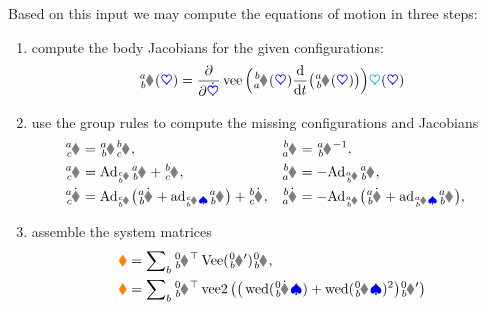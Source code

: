 Based on this input we may compute the equations of motion in three steps:
\begin{enumerate}
\item compute the body Jacobians for the given configurations:
\begin{align}\label{eq:RBSAlogJacobian}
 \bodyJac{\BidxI}{\BidxII}(\sysCoord) = \pdiff{\sysCoordd} \veeOp\Big( \bodyHomoCoord{\BidxII}{\BidxI}(\sysCoord) \diff{t} \big(\bodyHomoCoord{\BidxI}{\BidxII}(\sysCoord) \big) \Big) \kinMat(\sysCoord)
\end{align}
\item use the group rules to compute the missing configurations and Jacobians
\begin{subequations}
\begin{align}
 \bodyHomoCoord{\BidxI}{\BidxIII} &= \bodyHomoCoord{\BidxI}{\BidxII} \bodyHomoCoord{\BidxII}{\BidxIII},&
 \bodyHomoCoord{\BidxII}{\BidxI} &= \bodyHomoCoord{\BidxI}{\BidxII}^{-1},&
\\
 \bodyJac{\BidxI}{\BidxIII} &= \Ad{\bodyHomoCoord{\BidxIII}{\BidxII}} \bodyJac{\BidxI}{\BidxII} + \bodyJac{\BidxII}{\BidxIII},&
 \bodyJac{\BidxII}{\BidxI} &= -\Ad{\bodyHomoCoord{\BidxI}{\BidxII}} \bodyJac{\BidxI}{\BidxII},&
\\
 \bodyJacd{\BidxI}{\BidxIII} &= \Ad{\bodyHomoCoord{\BidxIII}{\BidxII}} \big(\bodyJacd{\BidxI}{\BidxII} + \ad{\bodyJac{\BidxIII}{\BidxII}\sysVel} \bodyJac{\BidxI}{\BidxII} \big) + \bodyJacd{\BidxII}{\BidxIII},&
 \bodyJacd{\BidxII}{\BidxI} &= -\Ad{\bodyHomoCoord{\BidxI}{\BidxII}} \big(\bodyJacd{\BidxI}{\BidxII} + \ad{\bodyJac{\BidxI}{\BidxII}\sysVel} \bodyJac{\BidxI}{\BidxII} \big),&
\end{align}
\end{subequations} 
\item assemble the system matrices
\begin{subequations}
\begin{align}
 \sysInertiaMat &= \sumBodies \bodyJac{0}{\BidxII}^\top \veeMatOp(\bodyInertiaMatp{0}{\BidxII}) \bodyJac{0}{\BidxII},
\\
 \gyroForce &= \sumBodies \bodyJac{0}{\BidxII}^\top \veeTwoOp \big(\big(\wedOp(\bodyJacd{0}{\BidxII} \sysVel) + \wedOp(\bodyJac{0}{\BidxII} \sysVel)^2 \big) \bodyInertiaMatp{0}{\BidxII} \big) 
\\

\end{align}
\end{subequations}
\end{enumerate}
